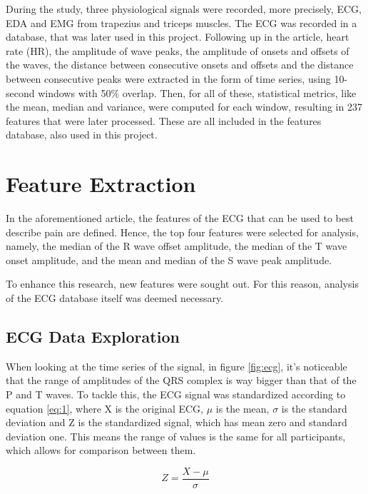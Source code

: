 During the study, three physiological signals were recorded, more precisely, ECG, EDA and EMG from trapezius and triceps muscles. The ECG was recorded in a database, that was later used in this project.
Following up in the article, heart rate (HR), the amplitude of wave peaks, the amplitude of onsets and offsets of the waves, the distance between consecutive onsets and offsets and the distance between consecutive peaks were extracted in the form of time series, using 10-second windows with 50\% overlap. 
Then, for all of these, statistical metrics, like the mean, median and variance, were computed for each window, resulting in 237 features that were later processed. 
These are all included in the features database, also used in this project.



\section{Feature Extraction}
In the aforementioned article, the features of the ECG that can be used to best describe pain are defined.
Hence, the top four features were selected for analysis, namely, the median of the R wave offset amplitude, the median of the T wave onset amplitude, and the mean and median of the S wave peak amplitude.

To enhance this research, new features were sought out. For this reason, analysis of the ECG database itself was deemed necessary. 


\subsection{ECG Data Exploration}
When looking at the time series of the signal, in figure \ref{fig:ecg}, it's noticeable that the range of amplitudes of the QRS complex is way bigger than that of the P and T waves.
To tackle this, the ECG signal was standardized according to equation \ref{eq:1}, where X is the original ECG, $\mu$ is the mean, $\sigma$ is the standard deviation and Z is the standardized signal, which has mean zero and standard deviation one. 
This means the range of values is the same for all participants, which allows for comparison between them.

\begin{equation} \label{eq:1}
Z = \frac{X-\mu}{\sigma}
\end{equation}


